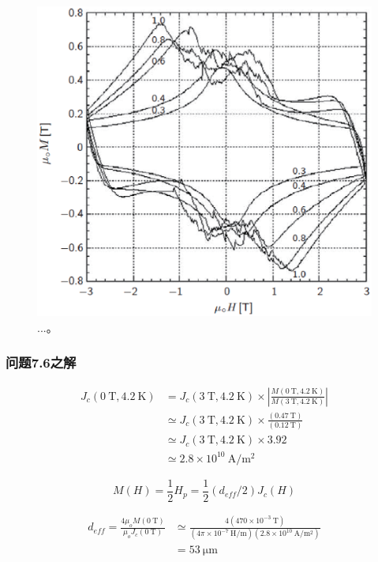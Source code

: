 \begin{figure}[htbp]
	\centering
	\includegraphics[scale=0.7]{chpt7/figs/fig7.20.eps}
	\caption{...。}
\end{figure}


\subsubsection{问题7.6之解}
\begin{align*}%
J_c(0\ \mathrm{T},4.2\ \mathrm{K})&=J_c(3\ \mathrm{T},4.2\ \mathrm{K})\times\left| \frac{M(0\ \mathrm{T},4.2\ \mathrm{K})}{M(3\ \mathrm{T},4.2\ \mathrm{K})}\right| \\ 
&\simeq J_c(3\ \mathrm{T},4.2\ \mathrm{K})\times\frac{(0.47\ \mathrm{T})}{(0.12\ \mathrm{T})}\\
&\simeq J_c(3\ \mathrm{T},4.2\ \mathrm{K})\times 3.92 \\
&\simeq 2.8\times 10^{10}\ \mathrm{A/m^2}
\end{align*}


\begin{equation}%
M(H)=\frac{1}{2}H_p=\frac{1}{2}(d_{eff}/2)J_c(H)
\end{equation}

\begin{align*}%
d_{eff}=\frac{4\mu_oM(0\ \mathrm{T})}{\mu_oJ_c(0\ \mathrm{T})}&\simeq\frac{4(470\times 10^{-3}\ \mathrm{T})}{(4\pi\times 10^{-7}\ \mathrm{H/m})(2.8\times10^{10}\ \mathrm{A/m^2})}\\
&=53\ \mathrm{\mu m}
\end{align*}

